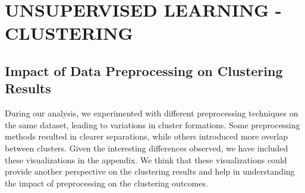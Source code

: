 
\section{UNSUPERVISED LEARNING - CLUSTERING}

    
    \subsection{Impact of Data Preprocessing on Clustering Results} %
    
        
    During our analysis, we experimented with different preprocessing techniques on the same dataset, leading to variations in cluster formations. Some preprocessing methods resulted in clearer separations, while others introduced more overlap between clusters. Given the interesting differences observed, we have included these visualizations in the appendix. We think that these visualizations could provide another perspective on the clustering results and help in understanding the impact of preprocessing on the clustering outcomes.
        
